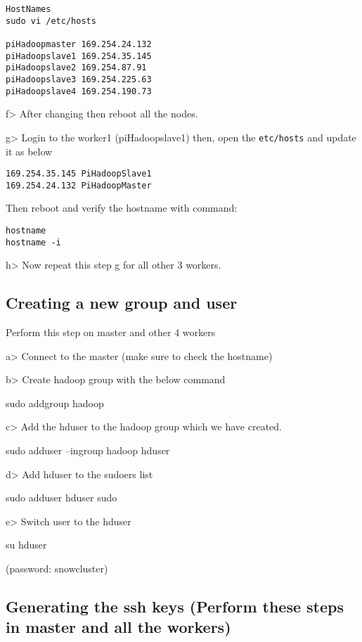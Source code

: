 \begin{lstlisting}
HostNames
sudo vi /etc/hosts

piHadoopmaster 169.254.24.132
piHadoopslave1 169.254.35.145
piHadoopslave2 169.254.87.91
piHadoopslave3 169.254.225.63
piHadoopslave4 169.254.190.73
\end{lstlisting}

f\textgreater{} After changing then reboot all the nodes.

g\textgreater{} Login to the worker1 (piHadoopslave1) then, open the
\texttt{etc/hosts} and update it as below

\begin{lstlisting}
169.254.35.145 PiHadoopSlave1
169.254.24.132 PiHadoopMaster
\end{lstlisting}

Then reboot and verify the hostname with command:

\begin{lstlisting}
hostname
hostname -i
\end{lstlisting}

h\textgreater{} Now repeat this step g for all other 3 workers.

\subsection{Creating a new group and user}

Perform this step on master and other 4 workers

a\textgreater{} Connect to the master (make sure to check the hostname)

b\textgreater{} Create hadoop group with the below command

sudo addgroup hadoop

c\textgreater{} Add the hduser to the hadoop group which we have
created.

sudo adduser --ingroup hadoop hduser

d\textgreater{} Add hduser to the sudoers list

sudo adduser hduser sudo

e\textgreater{} Switch user to the hduser

su hduser

(password: snowcluster)

\subsection{Generating the ssh keys (Perform these steps in master and all the workers)}


